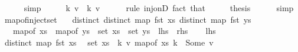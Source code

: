 \begin{isabellebody}
\ \ \ \ \isamarkupfalse%
\ simp\isanewline
\ \ \isamarkupfalse%
\ \isamarkupfalse%
\ {\isachardoublequoteopen}{\isacharparenleft}{\kern0pt}k{\isacharcomma}{\kern0pt}\ v{}{\isacharparenright}{\kern0pt}\ {\isacharequal}{\kern0pt}\ {\isacharparenleft}{\kern0pt}k{\isacharcomma}{\kern0pt}\ v{}{\isacharparenright}{\kern0pt}{\isachardoublequoteclose}\isanewline
\ \ \ \ \isamarkupfalse%
\ {\isacharparenleft}{\kern0pt}rule\ inj{\isacharunderscore}{\kern0pt}onD{\isacharparenright}{\kern0pt}\ {\isacharparenleft}{\kern0pt}fact\ that{\isacharparenright}{\kern0pt}{\isacharplus}{\kern0pt}\isanewline
\ \ \isamarkupfalse%
\ \isamarkupfalse%
\ {\isacharquery}{\kern0pt}thesis\isanewline
\ \ \ \ \isamarkupfalse%
\ simp\isanewline
{}\isamarkupfalse%
%
\endisatagproof
{\isafoldproof}%
%
\isadelimproof
\isanewline
%
\endisadelimproof
\isanewline
{}\isamarkupfalse%
\ map{\isacharunderscore}{\kern0pt}of{\isacharunderscore}{\kern0pt}inject{\isacharunderscore}{\kern0pt}set{\isacharcolon}{\kern0pt}\isanewline
\ \ \ distinct{\isacharcolon}{\kern0pt}\ {\isachardoublequoteopen}distinct\ {\isacharparenleft}{\kern0pt}map\ fst\ xs{\isacharparenright}{\kern0pt}{\isachardoublequoteclose}\ {\isachardoublequoteopen}distinct\ {\isacharparenleft}{\kern0pt}map\ fst\ ys{\isacharparenright}{\kern0pt}{\isachardoublequoteclose}\isanewline
\ \ \ {\isachardoublequoteopen}map{\isacharunderscore}{\kern0pt}of\ xs\ {\isacharequal}{\kern0pt}\ map{\isacharunderscore}{\kern0pt}of\ ys\ {\isasymlongleftrightarrow}\ set\ xs\ {\isacharequal}{\kern0pt}\ set\ ys{\isachardoublequoteclose}\ {\isacharparenleft}{\kern0pt}\ {\isachardoublequoteopen}{\isacharquery}{\kern0pt}lhs\ {\isasymlongleftrightarrow}\ {\isacharquery}{\kern0pt}rhs{\isachardoublequoteclose}{\isacharparenright}{\kern0pt}\isanewline
%
\isadelimproof
%
\endisadelimproof
%
\isatagproof
{}\isamarkupfalse%
\isanewline
\ \ \isamarkupfalse%
\ {\isacharquery}{\kern0pt}lhs\isanewline
\ \ \isamarkupfalse%
\ \isamarkupfalse%
\ {\isacartoucheopen}distinct\ {\isacharparenleft}{\kern0pt}map\ fst\ xs{\isacharparenright}{\kern0pt}{\isacartoucheclose}\ \isamarkupfalse%
\ {\isachardoublequoteopen}set\ xs\ {\isacharequal}{\kern0pt}\ {\isacharbraceleft}{\kern0pt}{\isacharparenleft}{\kern0pt}k{\isacharcomma}{\kern0pt}\ v{\isacharparenright}{\kern0pt}{\isachardot}{\kern0pt}\ map{\isacharunderscore}{\kern0pt}of\ xs\ k\ {\isacharequal}{\kern0pt}\ Some\ v{\isacharbraceright}{\kern0pt}{\isachardoublequoteclose}\isanewline

\end{isabellebody}
